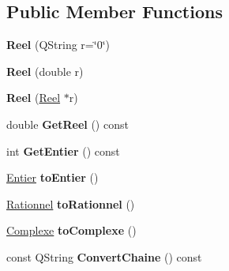 \subsection*{Public Member Functions}
\begin{DoxyCompactItemize}
\item 
\hypertarget{class_calcul_1_1_reel_ae0b25df32769db7d5108c181b64657c2}{{\bfseries Reel} (Q\-String r=\char`\"{}0\char`\"{})}\label{class_calcul_1_1_reel_ae0b25df32769db7d5108c181b64657c2}

\item 
\hypertarget{class_calcul_1_1_reel_a19d0ce325d4a7a3b9a299b792702168a}{{\bfseries Reel} (double r)}\label{class_calcul_1_1_reel_a19d0ce325d4a7a3b9a299b792702168a}

\item 
\hypertarget{class_calcul_1_1_reel_a6b1310b24cd92b2d59a646cadc29f576}{{\bfseries Reel} (\hyperlink{class_calcul_1_1_reel}{Reel} $\ast$r)}\label{class_calcul_1_1_reel_a6b1310b24cd92b2d59a646cadc29f576}

\item 
\hypertarget{class_calcul_1_1_reel_a75a6a4a791f47a05c38b92244f6cf5a0}{double {\bfseries Get\-Reel} () const }\label{class_calcul_1_1_reel_a75a6a4a791f47a05c38b92244f6cf5a0}

\item 
\hypertarget{class_calcul_1_1_reel_a6660d6f839cf55825042f458a0ec7e54}{int {\bfseries Get\-Entier} () const }\label{class_calcul_1_1_reel_a6660d6f839cf55825042f458a0ec7e54}

\item 
\hypertarget{class_calcul_1_1_reel_ae334416316678b356875791e125ba14a}{\hyperlink{class_calcul_1_1_entier}{Entier} {\bfseries to\-Entier} ()}\label{class_calcul_1_1_reel_ae334416316678b356875791e125ba14a}

\item 
\hypertarget{class_calcul_1_1_reel_ae21a0235c35a7fbb87c7c36108d861b9}{\hyperlink{class_calcul_1_1_rationnel}{Rationnel} {\bfseries to\-Rationnel} ()}\label{class_calcul_1_1_reel_ae21a0235c35a7fbb87c7c36108d861b9}

\item 
\hypertarget{class_calcul_1_1_reel_a222b9929b24dfee2928191055f1d03fa}{\hyperlink{class_calcul_1_1_complexe}{Complexe} {\bfseries to\-Complexe} ()}\label{class_calcul_1_1_reel_a222b9929b24dfee2928191055f1d03fa}

\item 
\hypertarget{class_calcul_1_1_reel_a92c0a269edf334bba71b08ef0e9e27e8}{const Q\-String {\bfseries Convert\-Chaine} () const }\label{class_calcul_1_1_reel_a92c0a269edf334bba71b08ef0e9e27e8}


\end{DoxyCompactItemize}
